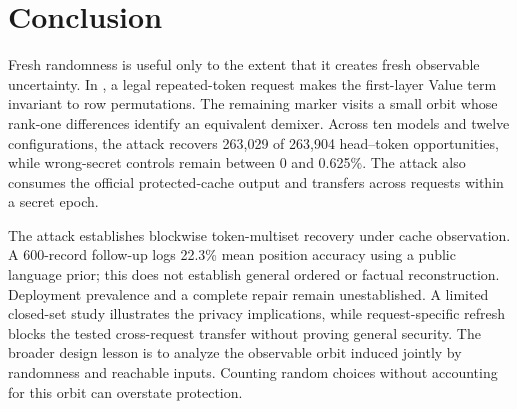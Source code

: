 \section{Conclusion}
Fresh randomness is useful only to the extent that it creates fresh observable uncertainty. In \scheme{}, a legal repeated-token request makes the first-layer Value term invariant to row permutations. The remaining marker visits a small orbit whose rank-one differences identify an equivalent demixer. Across ten models and twelve configurations, the attack recovers 263,029 of 263,904 head--token opportunities, while wrong-secret controls remain between 0 and 0.625\%. The attack also consumes the official protected-cache output and transfers across requests within a secret epoch.

The attack establishes blockwise token-multiset recovery under cache observation. A 600-record follow-up logs 22.3\% mean position accuracy using a public language prior; this does not establish general ordered or factual reconstruction. Deployment prevalence and a complete repair remain unestablished. A limited closed-set study illustrates the privacy implications, while request-specific refresh blocks the tested cross-request transfer without proving general security. The broader design lesson is to analyze the observable orbit induced jointly by randomness and reachable inputs. Counting random choices without accounting for this orbit can overstate protection.
